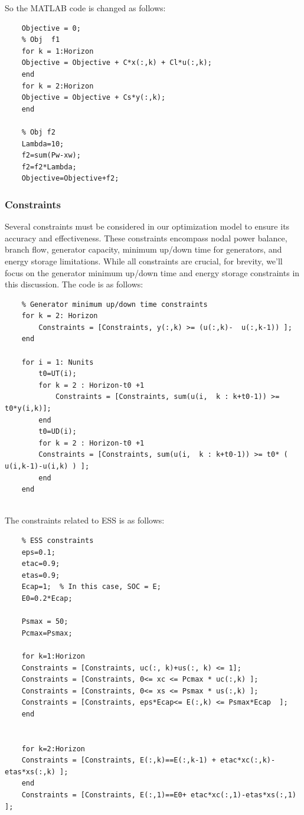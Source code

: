 \documentclass[lettersize,journal]{IEEEtran}
\begin{document}
So the MATLAB code is changed as follows:
\begin{lstlisting}
	Objective = 0;
	% Obj  f1
	for k = 1:Horizon
	Objective = Objective + C*x(:,k) + Cl*u(:,k);
	end
	for k = 2:Horizon
	Objective = Objective + Cs*y(:,k);
	end
	
	% Obj f2
	Lambda=10;
	f2=sum(Pw-xw);
	f2=f2*Lambda;
	Objective=Objective+f2;
\end{lstlisting}

\subsubsection{Constraints}
Several constraints must be considered in our optimization model to ensure its accuracy and effectiveness. These constraints encompass nodal power balance, branch flow, generator capacity, minimum up/down time for generators, and energy storage limitations. While all constraints are crucial, for brevity, we'll focus on the generator minimum up/down time and energy storage constraints in this discussion. The code is as follows:
\begin{lstlisting}
	% Generator minimum up/down time constraints
	for k = 2: Horizon
		Constraints = [Constraints, y(:,k) >= (u(:,k)-  u(:,k-1)) ];
	end
	
	for i = 1: Nunits
		t0=UT(i);
		for k = 2 : Horizon-t0 +1
			Constraints = [Constraints, sum(u(i,  k : k+t0-1)) >= t0*y(i,k)];
		end
		t0=UD(i);
		for k = 2 : Horizon-t0 +1
		Constraints = [Constraints, sum(u(i,  k : k+t0-1)) >= t0* ( u(i,k-1)-u(i,k) ) ];
		end
	end
	
\end{lstlisting}

The constraints related to ESS is as follows:
\begin{lstlisting}
	% ESS constraints
	eps=0.1;
	etac=0.9;
	etas=0.9;
	Ecap=1;  % In this case, SOC = E;
	E0=0.2*Ecap;
	
	Psmax = 50;
	Pcmax=Psmax;
	
	for k=1:Horizon
	Constraints = [Constraints, uc(:, k)+us(:, k) <= 1];
	Constraints = [Constraints, 0<= xc <= Pcmax * uc(:,k) ];
	Constraints = [Constraints, 0<= xs <= Psmax * us(:,k) ];
	Constraints = [Constraints, eps*Ecap<= E(:,k) <= Psmax*Ecap  ];  
	end
	
	
	for k=2:Horizon
	Constraints = [Constraints, E(:,k)==E(:,k-1) + etac*xc(:,k)-etas*xs(:,k) ];
	end
	Constraints = [Constraints, E(:,1)==E0+ etac*xc(:,1)-etas*xs(:,1) ];
\end{lstlisting}
\end{document}
